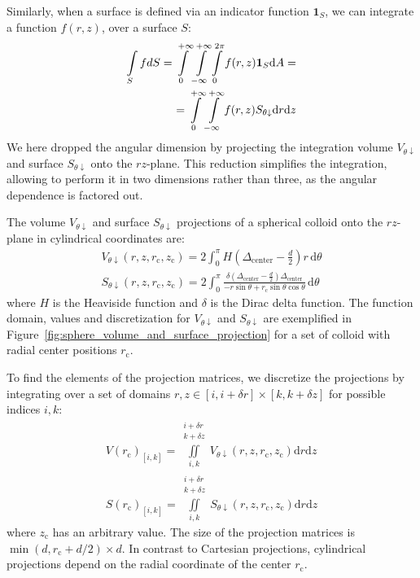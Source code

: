 \documentclass[10pt, a4paper]{article}
\begin{document}
\begin{multicols}{2}
Similarly, when a surface is defined via an indicator function $\bm{1}_S$, we can integrate a function $f(r, z)$, over a surface $S$:
\begin{eqnarray}
    \label{eq:int_indicator_S}
    \begin{split}
        \int\limits_{S} f dS = \int\displaylimits_{0}^{+\infty} \int\displaylimits_{-\infty}^{+\infty} \int\displaylimits_{0}^{2\pi} f(r, z) \bm{1}_S  \text{d}A =\\
        =\int\displaylimits_{0}^{+\infty} \int\displaylimits_{-\infty}^{+\infty} f(r, z)  S_{\theta \downarrow} \text{d}r \text{d}z
    \end{split}
\end{eqnarray}
We here dropped the angular dimension by projecting the integration volume $V_{\theta \downarrow}$ and surface $S_{\theta \downarrow}$ onto the $rz$-plane.
This reduction simplifies the integration, allowing to perform it in two dimensions rather than three, as the angular dependence is factored out.

The volume $V_{\theta \downarrow}$ and surface $S_{\theta \downarrow}$ projections of a spherical colloid onto the $rz$-plane in cylindrical coordinates are:
\begin{gather}
    V_{\theta \downarrow}(r, z, r_{\text{c}}, z_{\text{c}}) = 2\int_{0}^{\pi} H\left( \Delta_{\text{center}} - \frac{d}{2} \right) r \, \text{d}\theta
    \\
    S_{\theta \downarrow}(r, z, r_{\text{c}}, z_{\text{c}}) = 2\int_{0}^{\pi} \frac{\delta \left( \Delta_{\text{center}} - \frac{d}{2} \right) \Delta_{\text{center}}}{-r \sin \theta + r_{\text{c}} \sin \theta \cos \theta} \, \text{d}\theta
\end{gather}
where $H$ is the Heaviside function and $\delta$ is the Dirac delta function.
The function domain, values and discretization for $V_{\theta \downarrow}$ and $S_{\theta \downarrow}$ are exemplified in Figure~\ref{fig:sphere_volume_and_surface_projection} for a set of colloid with radial center positions $r_{\text{c}}$.

To find the elements of the projection matrices, we discretize the projections by integrating over a set of domains $r, z \in [i, i + \delta r] \times [k, k + \delta z]$ for possible indices $i,k$:
\begin{eqnarray}
    V(r_{\text{c}})_{[i, k]} = \iint \limits_{i, k}^{\substack{i+\delta r\\ k+\delta z}} V_{\theta \downarrow} (r, z, r_{\text{c}}, z_{\text{c}}) \text{d}r \text{d}z
    \\
    S(r_{\text{c}})_{[i, k]} = \iint \limits_{i, k}^{\substack{i+\delta r\\ k+\delta z}} S_{\theta \downarrow} (r, z, r_{\text{c}}, z_{\text{c}}) \text{d}r \text{d}z
\end{eqnarray}
where $z_{\text{c}}$ has an arbitrary value.
The size of the projection matrices is $\min(d, r_{\text{c}} + d/2) \times d$.
In contrast to Cartesian projections, cylindrical projections depend on the radial coordinate of the center $r_{\text{c}}$.


\end{multicols}
\end{document}

